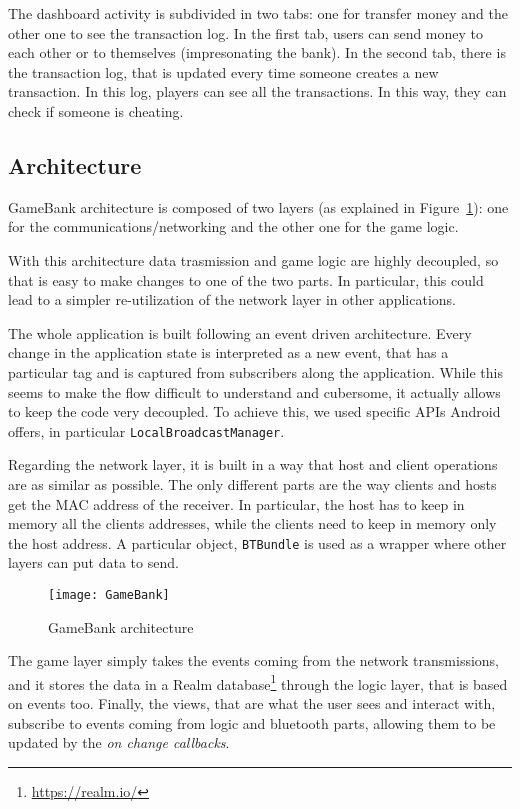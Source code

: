 The dashboard activity is subdivided in two tabs: one for transfer money and 
the other one to see the transaction log. In the first tab, users can send 
money to each other or to themselves (impresonating the bank). In the second 
tab, there is the transaction log, that is updated every time someone creates a 
new transaction. In this log, players can see all the transactions. In this 
way, they can check if someone is cheating. 

\subsection{Architecture}

GameBank architecture is composed of two layers (as 
explained in Figure~\ref{fig:gbArchitecture}): one for the 
communications/networking and the other one for the game logic. 

With this architecture data trasmission and game logic are highly decoupled, so 
that is easy to make changes to one of the two parts. In particular, this could 
lead to a simpler re-utilization of the network layer in other applications.

The whole application is built following an event driven architecture. Every 
change in the application state is interpreted as a new event, that has a 
particular tag and is captured from subscribers along the application. While 
this seems to make the flow difficult to understand and cubersome, it actually 
allows to keep the code very decoupled. To achieve this, we used specific APIs 
Android offers, in particular \texttt{LocalBroadcastManager}.

Regarding the network layer, it is built in a way that host and client 
operations are as similar as possible. The only different parts are the way 
clients and hosts get the MAC address of the receiver. In particular, the host 
has to keep in memory all the clients addresses, while the clients need to 
keep in memory only the host address. A particular object, \texttt{BTBundle} is 
used as a wrapper where other layers can put data to send.

\begin{figure}[t]
 \centering
 \texttt{[image: GameBank]}
 \caption{GameBank architecture}
 \label{fig:gbArchitecture}
\end{figure}

The game layer simply takes the events coming from the network transmissions, 
and it stores the data in a Realm database\footnote{\url{https://realm.io/}} 
through the logic layer, that is based on events too. Finally, the views, that 
are what the user sees and interact with, subscribe to events coming from logic 
and bluetooth parts, allowing them to be updated by the \textit{on change 
callbacks}.

